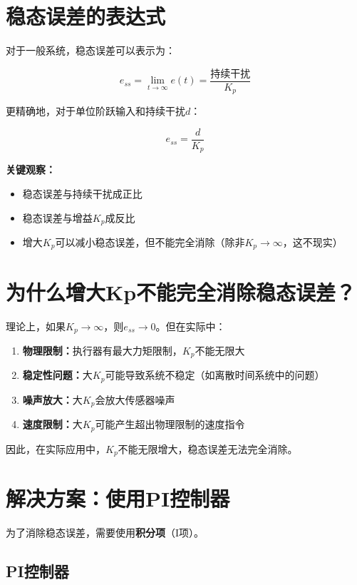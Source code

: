 \documentclass[12pt,a4paper]{article}
\begin{document}
\section{稳态误差的表达式}

对于一般系统，稳态误差可以表示为：

\begin{equation}
e_{ss} = \lim_{t \to \infty} e(t) = \frac{\text{持续干扰}}{K_p}
\end{equation}

更精确地，对于单位阶跃输入和持续干扰$d$：

\begin{equation}
e_{ss} = \frac{d}{K_p}
\end{equation}

\textbf{关键观察：}
\begin{itemize}
\item 稳态误差与持续干扰成正比
\item 稳态误差与增益$K_p$成反比
\item 增大$K_p$可以减小稳态误差，但不能完全消除（除非$K_p \to \infty$，这不现实）
\end{itemize}

\section{为什么增大Kp不能完全消除稳态误差？}

理论上，如果$K_p \to \infty$，则$e_{ss} \to 0$。但在实际中：

\begin{enumerate}
\item \textbf{物理限制：}执行器有最大力矩限制，$K_p$不能无限大
\item \textbf{稳定性问题：}大$K_p$可能导致系统不稳定（如离散时间系统中的问题）
\item \textbf{噪声放大：}大$K_p$会放大传感器噪声
\item \textbf{速度限制：}大$K_p$可能产生超出物理限制的速度指令
\end{enumerate}

因此，在实际应用中，$K_p$不能无限增大，稳态误差无法完全消除。

\section{解决方案：使用PI控制器}

为了消除稳态误差，需要使用\textbf{积分项}（I项）。

\subsection{PI控制器}
\end{document}
